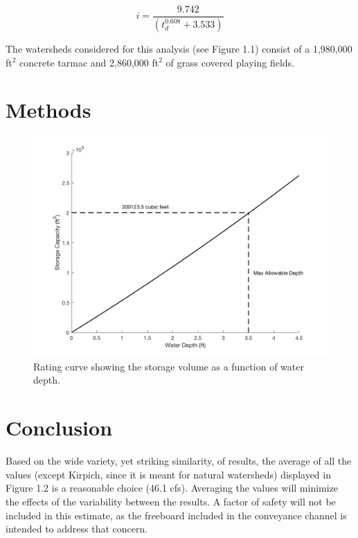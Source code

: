 \documentclass[11pt,letterpaper,final]{report}
\begin{document}
\begin{equation}
    i=\dfrac{9.742}{\left(t_d^{0.608}+3.533\right)}
\end{equation}

The watersheds considered for this analysis (see Figure 1.1) consist of a 1,980,000 ft$^2$ concrete tarmac and 2,860,000 ft$^2$ of grass covered playing fields. 

\section{Methods}

\begin{figure}[H]
    \centering
    \includegraphics[height=.4\textheight]{RCP.png}

    \caption{Rating curve showing the storage volume as a function of water depth.}
\end{figure}



\section{Conclusion}

Based on the wide variety, yet striking similarity, of results, the average of all the values (except Kirpich, since it is meant for natural watersheds) displayed in Figure 1.2 is a reasonable choice (46.1 cfs). Averaging the values will minimize the effects of the variability between the results. A factor of safety will not be included in this estimate, as the freeboard included in the conveyance channel is intended to address that concern. 
\end{document}

